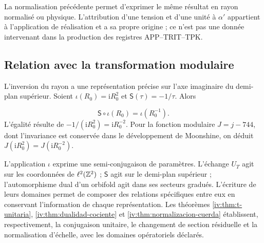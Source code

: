 La normalisation précédente permet d’exprimer le même résultat en
rayon normalisé ou physique. L’attribution d’une tension et d’une
unité à \(\alpha'\) appartient à l’application de réalisation et a
sa propre origine ; ce n’est pas une donnée intervenant dans la production
des registres APP--TRIT--TPK.

\subsection{Relation avec la transformation modulaire
}

L’inversion du rayon a une représentation précise sur
l’axe imaginaire du demi-plan supérieur. Soient
\(\iota(R_0)=\mathrm iR_0^2\) et
\(\mathsf S(\tau)=-1/\tau\). Alors

\begin{equation}
 \mathsf S\circ\iota(R_0)=\iota(R_0^{-1}).
 \label{iv:eq:semiconjugacion-modular}
\end{equation}
L’égalité résulte de
\(-1/(\mathrm iR_0^2)=\mathrm iR_0^{-2}\). Pour la fonction
modulaire \(J=j-744\), dont l’invariance est conservée dans le
développement de Moonshine, on déduit
\(J(\mathrm iR_0^2)=J(\mathrm iR_0^{-2})\).

L’application \(\iota\) exprime une semi-conjugaison de paramètres.
L’échange \(U_T\) agit sur les coordonnées de
\(\ell^2(\mathbb Z^2)\) ; \(\mathsf S\) agit sur le demi-plan
supérieur ; l’automorphisme dual d’un orbifold agit dans ses
secteurs gradués. L’écriture de leurs domaines permet de
composer des relations spécifiques entre eux en conservant
l’information de chaque représentation. Les théorèmes
\ref{iv:thm:t-unitaria}, \ref{iv:thm:dualidad-cociente}
et \ref{iv:thm:normalizacion-cuerda} établissent, respectivement,
la conjugaison unitaire, le changement de section résiduelle et la
normalisation d’échelle, avec les domaines opératoriels déclarés.

